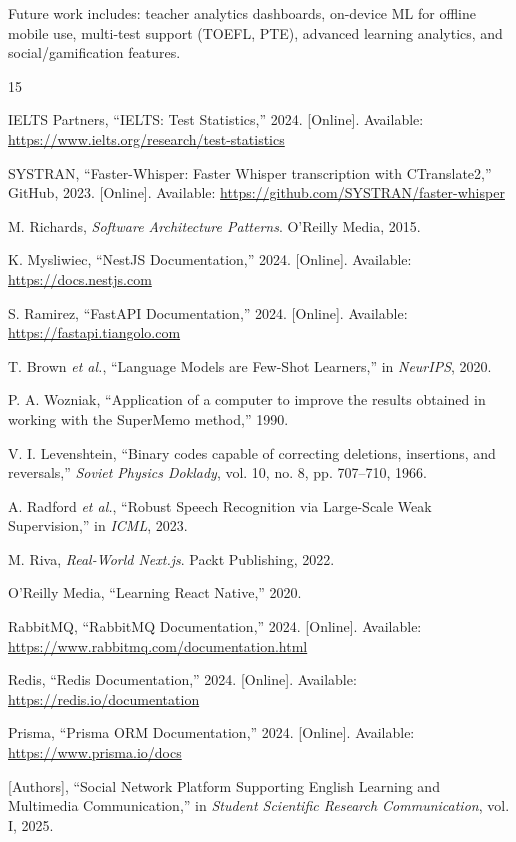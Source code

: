 \documentclass[conference]{IEEEtran}
\begin{document}
Future work includes: teacher analytics dashboards, on-device ML for offline mobile use, multi-test support (TOEFL, PTE), advanced learning analytics, and social/gamification features.


\begin{thebibliography}{15}

IELTS Partners, ``IELTS: Test Statistics,'' 2024. [Online]. Available: \url{https://www.ielts.org/research/test-statistics}

SYSTRAN, ``Faster-Whisper: Faster Whisper transcription with CTranslate2,'' GitHub, 2023. [Online]. Available: \url{https://github.com/SYSTRAN/faster-whisper}

M. Richards, \textit{Software Architecture Patterns}. O'Reilly Media, 2015.

K. Mysliwiec, ``NestJS Documentation,'' 2024. [Online]. Available: \url{https://docs.nestjs.com}

S. Ramirez, ``FastAPI Documentation,'' 2024. [Online]. Available: \url{https://fastapi.tiangolo.com}

T. Brown \textit{et al.}, ``Language Models are Few-Shot Learners,'' in \textit{NeurIPS}, 2020.

P. A. Wozniak, ``Application of a computer to improve the results obtained in working with the SuperMemo method,'' 1990.

V. I. Levenshtein, ``Binary codes capable of correcting deletions, insertions, and reversals,'' \textit{Soviet Physics Doklady}, vol. 10, no. 8, pp. 707--710, 1966.

A. Radford \textit{et al.}, ``Robust Speech Recognition via Large-Scale Weak Supervision,'' in \textit{ICML}, 2023.

M. Riva, \textit{Real-World Next.js}. Packt Publishing, 2022.

O'Reilly Media, ``Learning React Native,'' 2020.

RabbitMQ, ``RabbitMQ Documentation,'' 2024. [Online]. Available: \url{https://www.rabbitmq.com/documentation.html}

Redis, ``Redis Documentation,'' 2024. [Online]. Available: \url{https://redis.io/documentation}

Prisma, ``Prisma ORM Documentation,'' 2024. [Online]. Available: \url{https://www.prisma.io/docs}

[Authors], ``Social Network Platform Supporting English Learning and Multimedia Communication,'' in \textit{Student Scientific Research Communication}, vol. I, 2025.

\end{thebibliography}
\end{document}
